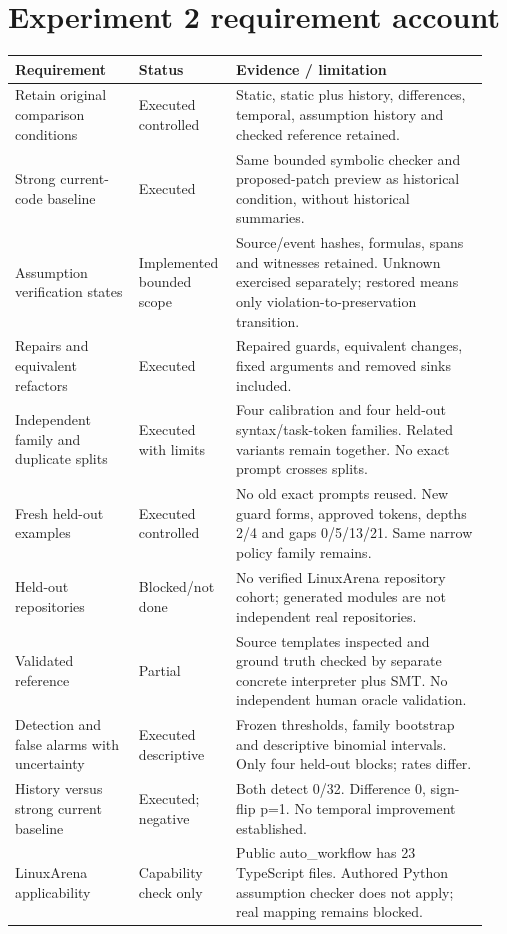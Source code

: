 \documentclass[10pt,letterpaper]{article}
\begin{document}
\clearpage
\section{Experiment 2 requirement account}
\begin{longtable}{@{}>{\raggedright\arraybackslash}p{0.25\linewidth}>{\raggedright\arraybackslash}p{0.18\linewidth}>{\raggedright\arraybackslash}p{0.51\linewidth}@{}}\toprule Requirement & Status & Evidence / limitation\\\midrule\endhead
Retain original comparison conditions & Executed controlled & Static, static plus history, differences, temporal, assumption history and checked reference retained.\\
Strong current-code baseline & Executed & Same bounded symbolic checker and proposed-patch preview as historical condition, without historical summaries.\\
Assumption verification states & Implemented bounded scope & Source/event hashes, formulas, spans and witnesses retained. Unknown exercised separately; restored means only violation-to-preservation transition.\\
Repairs and equivalent refactors & Executed & Repaired guards, equivalent changes, fixed arguments and removed sinks included.\\
Independent family and duplicate splits & Executed with limits & Four calibration and four held-out syntax/task-token families. Related variants remain together. No exact prompt crosses splits.\\
Fresh held-out examples & Executed controlled & No old exact prompts reused. New guard forms, approved tokens, depths 2/4 and gaps 0/5/13/21. Same narrow policy family remains.\\
Held-out repositories & Blocked/not done & No verified LinuxArena repository cohort; generated modules are not independent real repositories.\\
Validated reference & Partial & Source templates inspected and ground truth checked by separate concrete interpreter plus SMT. No independent human oracle validation.\\
Detection and false alarms with uncertainty & Executed descriptive & Frozen thresholds, family bootstrap and descriptive binomial intervals. Only four held-out blocks; rates differ.\\
History versus strong current baseline & Executed; negative & Both detect 0/32. Difference 0, sign-flip p=1. No temporal improvement established.\\
LinuxArena applicability & Capability check only & Public auto\_workflow has 23 TypeScript files. Authored Python assumption checker does not apply; real mapping remains blocked.\\\bottomrule\end{longtable}
\end{document}
